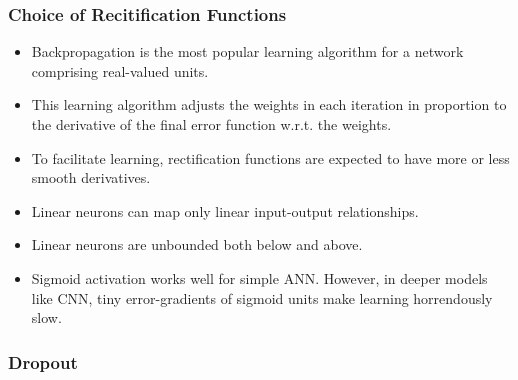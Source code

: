 \documentclass{beamer}
\begin{document}
\begin{frame}
	\frametitle{Choice of Recitification Functions }
	\begin{itemize}
		\item Backpropagation is the most popular learning algorithm for 
		a network comprising real-valued units. 
		\item This learning algorithm adjusts the weights in each iteration 		in proportion to the derivative of the final error function w.r.t. 
		the weights.
		\item To facilitate learning, rectification functions are expected 			to have more or less smooth derivatives.
		\item Linear neurons can map only linear input-output 						relationships.
		\item Linear neurons are unbounded both below and above.
		\item Sigmoid activation works well for simple ANN. However, in 
		deeper models like CNN, tiny error-gradients of sigmoid units make 			learning horrendously slow.
	\end{itemize}		
\end{frame}

\subsubsection{Dropout}
\end{document}
